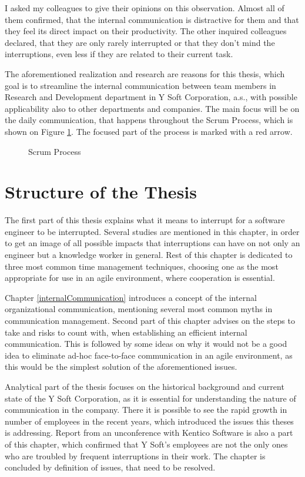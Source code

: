 \documentclass[11pt,singleside]{myfithesis2}
\newcommand{\pict}[4]{
	\begin{figure}[h!]
  		\vspace{-7px}
  		\centerline{\fcolorbox{darkgray}{palegray}{\texttt{[image: \#2]}}}
  		\caption{#1}
  		\label{#4}
	\end{figure}
}
\begin{document}
I asked my colleagues to give their opinions on this observation. Almost all of them confirmed, that the internal communication is distractive for them and that they feel its direct impact on their productivity. The other inquired colleagues declared, that they are only rarely interrupted or that they don't mind the interruptions, even less if they are related to their current task.

The aforementioned realization and research are reasons for this thesis, which goal is to streamline the internal communication between team members in Research and Development department in Y Soft Corporation, a.s., with possible applicability also to other departments and companies. The main focus will be on the daily communication, that happens throughout the Scrum Process, which is shown on Figure \ref{pic:scrumProcess}. The focused part of the process is marked with a red arrow.

\pict{Scrum Process \cite{scrumProcess}}{data/Scrum_process.png}{width=0.8\textwidth}{pic:scrumProcess}


	\section{Structure of the Thesis}
The first part of this thesis explains what it means to interrupt for a software engineer to be interrupted. Several studies are mentioned in this chapter, in order to get an image of all possible impacts that interruptions can have on not only an engineer but a knowledge worker in general. Rest of this chapter is dedicated to three most common time management techniques, choosing one as the most appropriate for use in an agile environment, where cooperation is essential.

Chapter \ref{internalCommunication} introduces a concept of the internal organizational communication, mentioning several most common myths in communication management. Second part of this chapter advises on the steps to take and risks to count with, when establishing an efficient internal communication. This is followed by some ideas on why it would not be a good idea to eliminate ad-hoc face-to-face communication in an agile environment, as this would be the simplest solution of the aforementioned issues.

Analytical part of the thesis focuses on the historical background and current state of the Y Soft Corporation, as it is essential for understanding the nature of communication in the company. There it is possible to see the rapid growth in number of employees in the recent years, which introduced the issues this theses is addressing. Report from an unconference with Kentico Software is also a part of this chapter, which confirmed that Y Soft's employees are not the only ones who are troubled by frequent interruptions in their work. The chapter is concluded by definition of issues, that need to be resolved.
\end{document}
